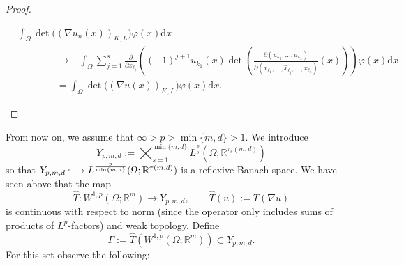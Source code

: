 \begin{proof}
\begin{itemize}
	\begin{align*}
		&\int_\Omega{\det\bigl((\nabla u_n(x))_{K,L}\bigr)\varphi(x)\mathrm{d}x}\\
		&\qquad\qquad\to-\int_\Omega{\sum_{j=1}^s{\frac{\partial}{\partial x_{\ell_j}}\left((-1)^{j+1}u_{k_1}(x)\det\left(\frac{\partial(u_{k_2},\dotsc,u_{k_s})}{\partial(x_{\ell_1},\dotsc,\widehat{x}_{\ell_j},\dotsc,x_{\ell_s})}(x)\right)\right)}\varphi(x)\mathrm{d}x}\\
		&\qquad\qquad=\int_\Omega{\det\bigl((\nabla u(x))_{K,L}\bigr)\varphi(x)\mathrm{d}x}.
	\end{align*}
\end{itemize}
\end{proof}


From now on, we assume that $\infty>p>\min\{m,d\}>1$. We introduce
\[Y_{p,m,d}:=\bigtimes_{s=1}^{\min\{m,d\}}{L^{\frac{p}{s}}\left(\Omega;\mathbb{R}^{\tau_s(m,d)}\right)}\]
so that $Y_{p,m,d}\longhookrightarrow L^{\frac{p}{\min\{m,d\}}}(\Omega;\mathbb{R}^{\tau(m,d)})$ is a reflexive Banach space. We have seen above that the map
\[\widehat{T}:W^{1,p}(\Omega;\mathbb{R}^m)\longrightarrow Y_{p,m,d},\qquad\widehat{T}(u):=T(\nabla u)\]
is continuous with respect to norm (since the operator only includes sums of products of $L^p$-factors) and weak topology. Define
\[\Gamma:=\widehat{T}\left(W^{1,p}(\Omega;\mathbb{R}^m)\right)\subset Y_{p,m,d}.\]
For this set observe the following:
